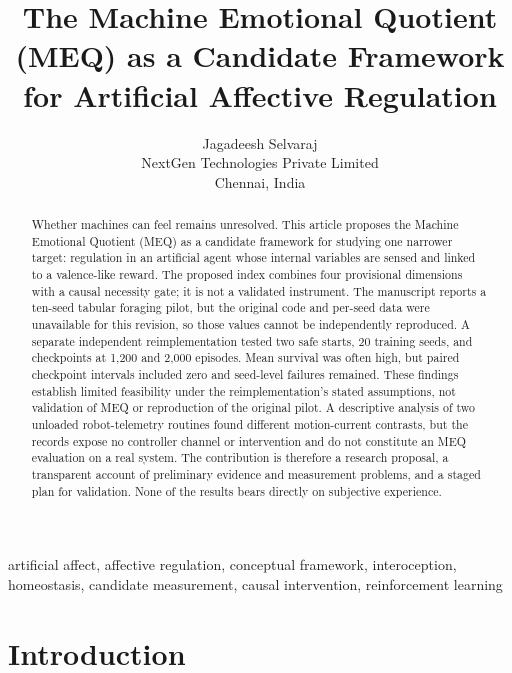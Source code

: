 \documentclass[twoside,11pt]{article}
\begin{document}
\title{The Machine Emotional Quotient (MEQ) as a Candidate Framework for Artificial Affective Regulation}

\author{\name Jagadeesh Selvaraj  \\
       \addr NextGen Technologies Private Limited\\
       Chennai, India}


\maketitle

\begin{abstract}
Whether machines can feel remains unresolved. This article proposes the Machine Emotional Quotient (MEQ) as a candidate framework for studying one narrower target: regulation in an artificial agent whose internal variables are sensed and linked to a valence-like reward. The proposed index combines four provisional dimensions with a causal necessity gate; it is not a validated instrument. The manuscript reports a ten-seed tabular foraging pilot, but the original code and per-seed data were unavailable for this revision, so those values cannot be independently reproduced. A separate independent reimplementation tested two safe starts, 20 training seeds, and checkpoints at 1,200 and 2,000 episodes. Mean survival was often high, but paired checkpoint intervals included zero and seed-level failures remained. These findings establish limited feasibility under the reimplementation's stated assumptions, not validation of MEQ or reproduction of the original pilot. A descriptive analysis of two unloaded robot-telemetry routines found different motion-current contrasts, but the records expose no controller channel or intervention and do not constitute an MEQ evaluation on a real system. The contribution is therefore a research proposal, a transparent account of preliminary evidence and measurement problems, and a staged plan for validation. None of the results bears directly on subjective experience.
\end{abstract}

\begin{keywords}
artificial affect, affective regulation, conceptual framework, interoception, homeostasis, candidate measurement, causal intervention, reinforcement learning
\end{keywords}

\section{Introduction}\label{sec:1}
\end{document}
